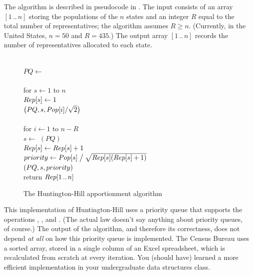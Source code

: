 The algorithm is described in pseudocode in . The input consists of an array $[1\,..\,n]$ storing the populations of the $n$ states and an integer $R$ equal to the total number of representatives; the algorithm assumes $R \ge n$. (Currently, in the United States, $n = 50$ and $R = 435$.) The output array $[1\,..\,n]$ records the number of representatives allocated to each state.

\begin{figure}[ht]
\centering
\begin{pseudocode}
\\
$PQ \gets$ \\[0.5ex]
\\
for $s \gets 1$ to $n$\\
\Indent $Rep[s] \gets 1$\\
\Indent {}$\bigl(PQ, s, Pop[i]/\sqrt{2}\bigr)$\\[0.5ex]
\\
for $i \gets 1$ to $n - R$\\
\Indent $s \gets$ $(PQ)$\\
\Indent $Rep[s] \gets Rep[s] + 1$\\
\Indent $priority \gets Pop[s] \bigm/ \sqrt{Rep[s](Rep[s] + 1)}$\\
\Indent {}$(PQ, s, priority)$\\[0.8ex]
return $Rep[1\,..\,n]$
\end{pseudocode}
\caption{The Huntington-Hill apportionment algorithm}
\label{fig:0.5}
\end{figure}
This implementation of Huntington-Hill uses a priority queue that supports the operations , , and . (The actual law doesn’t say anything about priority queues, of course.) The output of the algorithm, and therefore its correctness, does not depend \textit{at all} on how this priority queue is implemented. The Census Bureau uses a sorted array, stored in a single column of an Excel spreadsheet, which is recalculated from scratch at every iteration. You (should have) learned a more efficient implementation in your undergraduate data structures class.

